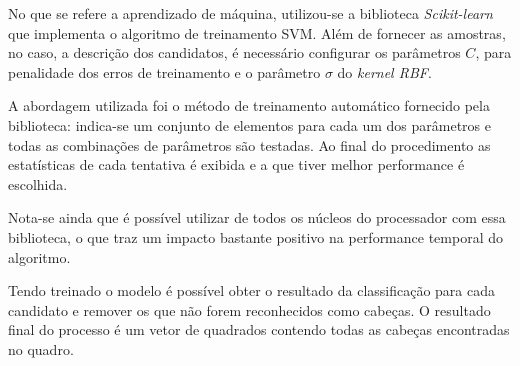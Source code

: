 No que se refere a aprendizado de máquina, utilizou-se a biblioteca \textit{Scikit-learn} que implementa o algoritmo de treinamento SVM. Além de fornecer as amostras, no caso, a descrição dos candidatos, é necessário configurar os parâmetros $C$, para penalidade dos erros de treinamento e o parâmetro $\sigma$ do \textit{kernel RBF}. 

A abordagem utilizada foi o método de treinamento automático fornecido pela biblioteca: indica-se um conjunto de elementos para cada um dos parâmetros e todas as combinações de parâmetros são testadas. Ao final do procedimento as estatísticas de cada tentativa é exibida e a que tiver melhor performance é escolhida.

Nota-se ainda que é possível utilizar de todos os núcleos do processador com essa biblioteca, o que traz um impacto bastante positivo na performance temporal do algoritmo.

Tendo treinado o modelo é possível obter o resultado da classificação para cada candidato e remover os que não forem reconhecidos como cabeças. O resultado final do processo é um vetor de quadrados contendo todas as cabeças encontradas no quadro.

